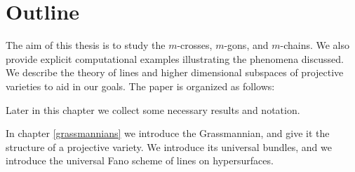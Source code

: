 


\section{Outline}
The aim of this thesis is to study the $m$-crosses, $m$-gons, and $m$-chains. We also provide explicit computational examples illustrating the phenomena discussed. We describe the theory of lines and higher dimensional subspaces of projective varieties to aid in our goals. The paper is organized as follows:

Later in this chapter we collect some necessary results and notation.

In chapter \ref{grassmannians} we introduce the Grassmannian, and give it the structure of a projective variety. We introduce its universal bundles, and we introduce the universal Fano scheme of lines on hypersurfaces. 

